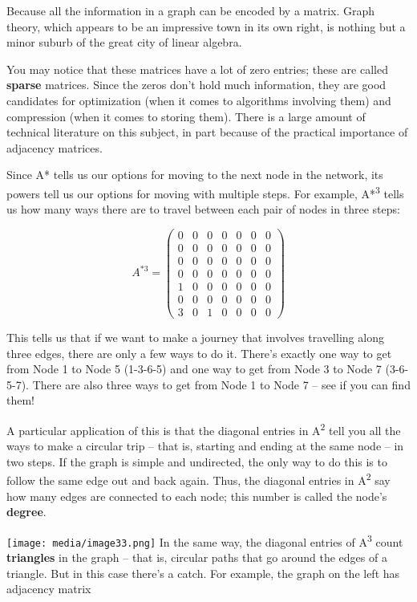 \documentclass[oneside,english]{amsbook}
\numberwithin{section}{chapter}
\theoremstyle{plain}
\theoremstyle{definition}
\begin{document}
Because all the information in a graph can be encoded by a matrix. Graph
theory, which appears to be an impressive town in its own right, is
nothing but a minor suburb of the great city of linear algebra.

You may notice that these matrices have a lot of zero entries; these are
called \textbf{sparse} matrices. Since the zeros don't hold much
information, they are good candidates for optimization (when it comes to
algorithms involving them) and compression (when it comes to storing
them). There is a large amount of technical literature on this subject,
in part because of the practical importance of adjacency matrices.

Since A* tells us our options for moving to the next node in the
network, its powers tell us our options for moving with multiple steps.
For example, A*\textsuperscript{3} tells us how many ways there are to
travel between each pair of nodes in three steps:

\[A^{*3} = \begin{pmatrix}
	0 & 0 & 0 & 0 & 0 & 0 & 0 \\
	0 & 0 & 0 & 0 & 0 & 0 & 0 \\
	0 & 0 & 0 & 0 & 0 & 0 & 0 \\
	0 & 0 & 0 & 0 & 0 & 0 & 0 \\
	1 & 0 & 0 & 0 & 0 & 0 & 0 \\
	0 & 0 & 0 & 0 & 0 & 0 & 0 \\
	3 & 0 & 1 & 0 & 0 & 0 & 0
\end{pmatrix}\]

This tells us that if we want to make a journey that involves travelling
along three edges, there are only a few ways to do it. There's exactly
one way to get from Node 1 to Node 5 (1-3-6-5) and one way to get from
Node 3 to Node 7 (3-6-5-7). There are also three ways to get from Node 1
to Node 7 -- see if you can find them!

A particular application of this is that the diagonal entries in
A\textsuperscript{2} tell you all the ways to make a circular trip --
that is, starting and ending at the same node -- in two steps. If the
graph is simple and undirected, the only way to do this is to follow the
same edge out and back again. Thus, the diagonal entries in
A\textsuperscript{2} say how many edges are connected to each node; this
number is called the node's \textbf{degree}.

\texttt{[image: media/image33.png]}
In the same way, the diagonal entries of A\textsuperscript{3} count
\textbf{triangles} in the graph -- that is, circular paths that go
around the edges of a triangle. But in this case there's a catch. For
example, the graph on the left has adjacency matrix
\end{document}
